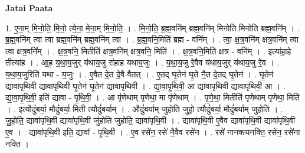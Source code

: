 \documentclass[17pt]{extarticle}
\begin{document}
\textbf{Jatai Paata} \newline

1. ए॒ना॒म् मि॒नो॒ति॒ मि॒नो॒ त्ये॒ना॒ मे॒ना॒म् मि॒नो॒ति॒ । . मि॒नो॒ति॒ ब्र॒ह्म॒वनि॑म् ब्रह्म॒वनि॑म् मिनोति मिनोति ब्रह्म॒वनि᳚म् । . ब्र॒ह्म॒वनि॑म् त्वा त्वा ब्रह्म॒वनि॑म् ब्रह्म॒वनि॑म् त्वा । . ब्र॒ह्म॒वनि॒मिति॑ ब्रह्म - वनि᳚म् । . त्वा॒ क्ष॒त्र॒वनि॑म् क्षत्र॒वनि॑म् त्वा त्वा क्षत्र॒वनि᳚म् । . क्ष॒त्र॒वनि॒ मितीति॑ क्षत्र॒वनि॑म् क्षत्र॒वनि॒ मिति॑ । . क्ष॒त्र॒वनि॒मिति॑ क्षत्र - वनि᳚म् । . इत्या॑हा॒हे तीत्या॑ह । . आ॒ह॒ य॒था॒य॒जुर् य॑थाय॒जु रा॑हाह यथाय॒जुः । . य॒था॒य॒जु रे॒वैव य॑थाय॒जुर् य॑थाय॒जु रे॒व । . य॒था॒य॒जुरिति॑ यथा - य॒जुः । . ए॒वैत दे॒त दे॒वै वैतत् । . ए॒तद् घृ॒तेन॑ घृ॒ते नै॒त दे॒तद् घृ॒तेन॑ । . घृ॒तेन॑ द्यावापृथिवी द्यावापृथिवी घृ॒तेन॑ घृ॒तेन॑ द्यावापृथिवी । . द्या॒वा॒पृ॒थि॒वी॒ आ द्या॑वापृथिवी द्यावापृथिवी॒ आ । . द्या॒वा॒पृ॒थि॒वी॒ इति॑ द्यावा - पृ॒थि॒वी॒ । . आ पृ॑णेथाम् पृणेथा॒ मा पृ॑णेथाम् । . पृ॒णे॒था॒ मितीति॑ पृणेथाम् पृणेथा॒ मिति॑ । . इत्यौदुं॑बर्या॒ मौदुं॑बर्या॒ मिती त्यौदुं॑बर्याम् । . औदुं॑बर्याम् जुहोति जुहो॒ त्यौदुं॑बर्या॒ मौदुं॑बर्याम् जुहोति । . जु॒हो॒ति॒ द्यावा॑पृथि॒वी द्यावा॑पृथि॒वी जु॑होति जुहोति॒ द्यावा॑पृथि॒वी । . द्यावा॑पृथि॒वी ए॒वैव द्यावा॑पृथि॒वी द्यावा॑पृथि॒वी ए॒व । . द्यावा॑पृथि॒वी इति॒ द्यावा᳚ - पृ॒थि॒वी । . ए॒व रसे॑न॒ रसे॑ नै॒वैव रसे॑न । . रसे॑ नानक्त्यनक्ति॒ रसे॑न॒ रसे॑ना नक्ति । \newline
\end{document}
